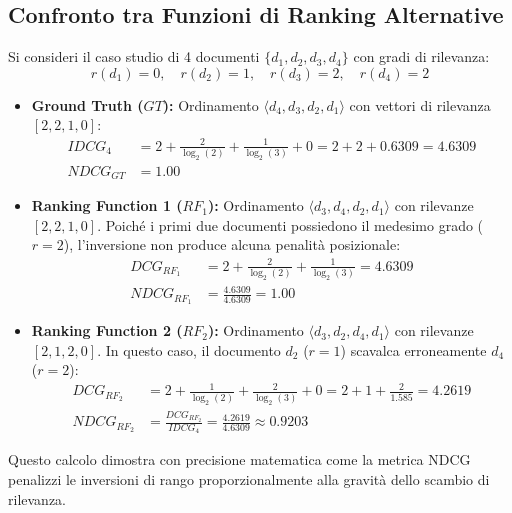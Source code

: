 \subsection{Confronto tra Funzioni di Ranking Alternative}
Si consideri il caso studio di 4 documenti $\{d_1, d_2, d_3, d_4\}$ con gradi di rilevanza:
\[
r(d_1) = 0, \quad r(d_2) = 1, \quad r(d_3) = 2, \quad r(d_4) = 2
\]
\begin{itemize}
    \item \textbf{Ground Truth ($GT$):} Ordinamento $\langle d_4, d_3, d_2, d_1 \rangle$ con vettori di rilevanza $[2, 2, 1, 0]$:
    \begin{align*}
    IDCG_4 &= 2 + \frac{2}{\log_2(2)} + \frac{1}{\log_2(3)} + 0 = 2 + 2 + 0.6309 = 4.6309 \\
    NDCG_{GT} &= 1.00
    \end{align*}
    \item \textbf{Ranking Function 1 ($RF_1$):} Ordinamento $\langle d_3, d_4, d_2, d_1 \rangle$ con rilevanze $[2, 2, 1, 0]$.
    Poiché i primi due documenti possiedono il medesimo grado ($r=2$), l'inversione non produce alcuna penalità posizionale:
    \begin{align*}
    DCG_{RF_1} &= 2 + \frac{2}{\log_2(2)} + \frac{1}{\log_2(3)} = 4.6309 \\
    NDCG_{RF_1} &= \frac{4.6309}{4.6309} = 1.00
    \end{align*}
    \item \textbf{Ranking Function 2 ($RF_2$):} Ordinamento $\langle d_3, d_2, d_4, d_1 \rangle$ con rilevanze $[2, 1, 2, 0]$.
    In questo caso, il documento $d_2$ ($r=1$) scavalca erroneamente $d_4$ ($r=2$):
    \begin{align*}
    DCG_{RF_2} &= 2 + \frac{1}{\log_2(2)} + \frac{2}{\log_2(3)} + 0 = 2 + 1 + \frac{2}{1.585} = 4.2619 \\
    NDCG_{RF_2} &= \frac{DCG_{RF_2}}{IDCG_4} = \frac{4.2619}{4.6309} \approx 0.9203
    \end{align*}
\end{itemize}
Questo calcolo dimostra con precisione matematica come la metrica NDCG penalizzi le inversioni di rango proporzionalmente alla gravità dello scambio di rilevanza.
